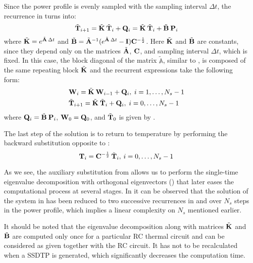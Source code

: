 Since the power profile is evenly sampled with the sampling interval $\Delta t$, the recurrence in  turns into:
\[
  \tilde{\mathbf{T}}_{i+1} = \tilde{\mathbf{K}} \: \tilde{\mathbf{T}}_i + \mathbf{Q}_i = \tilde{\mathbf{K}} \: \tilde{\mathbf{T}}_i + \tilde{\mathbf{B}} \: \mathbf{P}_i
\]
where $\tilde{\mathbf{K}} = e^{\tilde{\mathbf{A}} \: \Delta t}$ and $\tilde{\mathbf{B}} = \tilde{\mathbf{A}}^{-1} ( e^{\tilde{\mathbf{A}} \: \Delta t} - \mathbf{I} ) \mathbf{C}^{-\frac{1}{2}}$. Here $\tilde{\mathbf{K}}$ and $\tilde{\mathbf{B}}$ are constants, since they depend only on the matrices $\tilde{\mathbf{A}}$, $\mathbf{C}$, and sampling interval $\Delta t$, which is fixed. In this case, the block diagonal of the matrix $\tilde{\mathbb{A}}$, similar to , is composed of the same repeating block $\tilde{\mathbf{K}}$ and the recurrent expressions take the following form:
\begin{align}
  & \mathbf{W}_i = \tilde{\mathbf{K}} \: \mathbf{W}_{i - 1} + \mathbf{Q}_i, \; i = 1, \dots, N_s - 1 \label{eq:final-p-recurrence} \\
  & \tilde{\mathbf{T}}_{i + 1} = \tilde{\mathbf{K}} \: \tilde{\mathbf{T}}_i + \mathbf{Q}_i, \; i = 0, \dots, N_s - 1 \label{eq:final-y-recurrence}
\end{align}
where $\mathbf{Q}_i = \tilde{\mathbf{B}} \: \mathbf{P}_i$, $\mathbf{W}_0 = \mathbf{Q}_0$, and $\tilde{\mathbf{T}}_0$ is given by .

The last step of the solution is to return to temperature by performing the backward substitution opposite to :
\[
  \mathbf{T}_i = \mathbf{C}^{-\frac{1}{2}} \: \tilde{\mathbf{T}}_i, \: i = 0, \dots, N_s - 1
\]

As we see, the auxiliary substitution from  allows us to perform the single-time eigenvalue decomposition with orthogonal eigenvectors () that later eases the computational process at several stages. In  it can be observed that the solution of the system in  has been reduced to two successive recurrences in  and  over $N_s$ steps in the power profile, which implies a linear complexity on $N_s$ mentioned earlier.

It should be noted that the eigenvalue decomposition along with matrices $\tilde{\mathbf{K}}$ and $\tilde{\mathbf{B}}$ are computed only once for a particular RC thermal circuit and can be considered as given together with the RC circuit. It has not to be recalculated when a SSDTP is generated, which significantly decreases the computation time.
